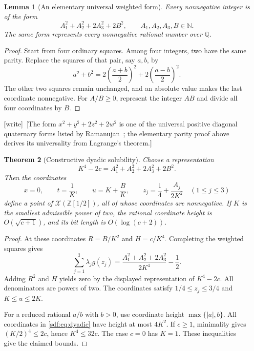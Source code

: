 \documentclass[11pt,a4paper]{article}
\newtheorem{theorem}{Theorem}[section]
\newtheorem{lemma}[theorem]{Lemma}
\theoremstyle{definition}
\theoremstyle{remark}
\newcommand{\N}{\mathbb N}
\newcommand{\Z}{\mathbb Z}
\newcommand{\Q}{\mathbb Q}
\newcommand{\guard}{g}
\newcommand{\variety}{\mathcal X}
\newcommand{\wtag}{\textup{[write]}}
\begin{document}
\begin{lemma}[An elementary universal weighted form]\label{sdf:lem:1122}
Every nonnegative integer is of the form
\[
 A_1^2+A_2^2+2A_3^2+2B^2,
 \qquad A_1,A_2,A_3,B\in\N.
\]
The same form represents every nonnegative rational number over $\Q$.
\end{lemma}
\begin{proof}
Start from four ordinary squares. Among four integers, two have the same
parity. Replace the squares of that pair, say $a,b$, by
\[
 a^2+b^2=2\left(\frac{a+b}{2}\right)^2+
        2\left(\frac{a-b}{2}\right)^2.
\]
The other two squares remain unchanged, and an absolute value makes the last
coordinate nonnegative. For $A/B\ge0$, represent the integer $AB$ and
divide all four coordinates by $B$.
\end{proof}

\wtag\ [The form $x^2+y^2+2z^2+2w^2$ is one of the universal positive
diagonal quaternary forms listed by Ramanujan~\cite{ramanujan}; the
elementary parity proof above derives its universality from Lagrange's
theorem.]

\begin{theorem}[Constructive dyadic solubility]\label{sdf:thm:dyadic}
Choose a representation
\[
 K^4-2c=A_1^2+A_2^2+2A_3^2+2B^2.
\]
Then the coordinates
\begin{equation}\label{sdf:eq:dyadic}
 x=0,\qquad t=\frac1K,\qquad u=K+\frac BK,\qquad
 z_j=\frac14+\frac{A_j}{2K^2}\quad(1\le j\le3)
\end{equation}
define a point of $\variety(\Z[1/2])$, all of whose coordinates are
nonnegative. If $K$ is the smallest admissible power of two, the rational
coordinate height is $O(\sqrt{c+1})$, and its bit length is $O(\log(c+2))$.
\end{theorem}
\begin{proof}
At these coordinates $R=B/K^2$ and $H=c/K^4$. Completing the weighted
squares gives
\[
 \sum_{j=1}^3\lambda_j\guard(z_j)
 =\frac{A_1^2+A_2^2+2A_3^2}{2K^4}-\frac12.
\]
Adding $R^2$ and $H$ yields zero by the displayed representation of
$K^4-2c$. All denominators are powers of two. The coordinates satisfy
$1/4\le z_j\le3/4$ and $K\le u\le2K$.

For a reduced rational $a/b$ with $b>0$, use coordinate height
$\max\{|a|,b\}$. All coordinates in \eqref{sdf:eq:dyadic} have height at most
$4K^2$. If $c\ge1$, minimality gives $(K/2)^4\le2c$, hence $K^4\le32c$.
The case $c=0$ has $K=1$. These inequalities give the claimed bounds.
\end{proof}
\end{document}
